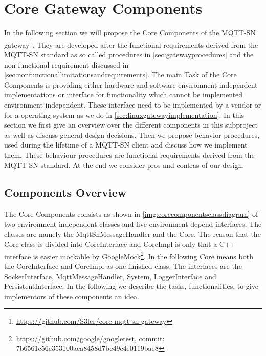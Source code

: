 \section{Core Gateway Components}\label{sec:coregatewaycomponents}
In the following section we will propose the Core Components of the MQTT-SN gateway\footnote{\url{https://github.com/S3ler/core-mqtt-sn-gateway}}.
They are developed after the functional requirements derived from the MQTT-SN standard as so called procedures in \autoref{sec:gatewayprocedures} and the non-functional requirement discussed in \autoref{sec:nonfunctionallimitationsandrequirements}.
The main Task of the Core Components is providing either hardware and software environment independent implementations or interface for functionality which cannot be implemented environment independent.
These interface need to be implemented by a vendor or for a operating system as we do in \autoref{sec:linuxgatewayimplementation}.
In this section we first give an overview over the different components in this subproject as well as discuss general design decisions.
Then we propose behavior procedures, used during the lifetime of a MQTT-SN client and discuss how we implement them.
These behaviour procedures are functional requirements derived from the MQTT-SN standard.
At the end we consider pros and contras of our design.

\subsection{Components Overview}
The Core Components consists as shown in \autoref{img:corecomponentsclassdiagram} of two environment independent classes and five environment depend interfaces.
The classes are namely the MqttSnMessageHandler and the Core.
The reason that the Core class is divided into CoreInterface and CoreImpl is only that a C++ interface is easier mockable by GoogleMock\footnote{\url{https://github.com/google/googletest}, commit: 7b6561c56e353100aca8458d7bc49c4e0119bae8}. In the following Core means both the CoreInterface and CoreImpl as one finished class.
The interfaces are the SocketInterface, MqttMessageHandler, System, LoggerInterface and PersistentInterface.
In the following we describe the tasks, functionalities, to give implementors of these components an idea.
